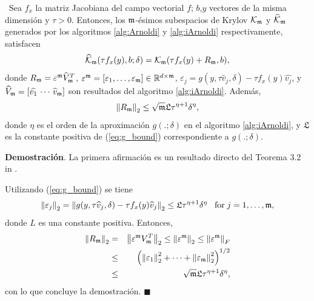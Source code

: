 \begin{theorem} \label{theorem:krilobapproxequality} \cite{naranjo2023jacobian}~Sea $f_x$ la matriz Jacobiana del campo vectorial $f$; $b$,$y$ vectores de la misma dimensión y $\tau>0$. Entonces, los $\mathfrak{m}$-ésimos subespacios de Krylov $\mathcal{K}_{\mathfrak{m}}$ y $\widehat{\mathcal{K}}_{\mathfrak{m}}$ generados por los algoritmos \ref{alg:Arnoldi} y \ref{alg:iArnoldi} respectivamente, satisfacen 
	\[ \widehat{\mathcal{K}}_{\mathfrak{m}}(\tau f_x(y),b;\delta) = \mathcal{K}_{\mathfrak{m}}(\tau f_x(y)+R_{\mathfrak{m}},b), \]
	donde $R_{\mathfrak{m}} =  \varepsilon^{\mathfrak{m}}\widehat{V}^T_{\mathfrak{m}}$,  
	$\varepsilon^{\mathfrak{m}} = [\varepsilon_1,\dots,\varepsilon_{\mathfrak{m}}] \in \mathbb{R}^{d\times \mathfrak{m}}$, $\varepsilon_j = g(y,\tau\widehat{v}_j,\delta)- \tau f_x(y)\widehat{v_j}$, y $\widehat{V}_{\mathfrak{m}}=[\widehat{v_1}\,\cdots \,\widehat{v}_{\mathfrak{m}}]$ son resultados del algoritmo \ref{alg:iArnoldi}. Además, 
	\[ \left\lVert R_{\mathfrak{m}} \right\rVert_2\leq \sqrt{\mathfrak{m}}\mathfrak{L} \tau^{\eta+1}\delta^{\eta}, \]
	donde $\eta$ es el orden de la aproximación $g(.;\delta)$ en el algoritmo \ref{alg:iArnoldi}, y $\mathfrak{L}$ es la constante positiva de (\ref{eq:g_bound}) correspondiente a $g(.;\delta)$.
\end{theorem}
\textbf{Demostración}. La primera afirmación es un resultado directo del Teorema 3.2 in \cite{brown1987local}.

Utilizando  (\ref{eq:g_bound}) se tiene
\[ \left\lVert \varepsilon_j \right\rVert_2=\left\lVert g(y,\tau\widehat{v}_j,\delta)-\tau f_x(y)\widehat{v}_j \right\rVert_2 \leq  \mathfrak{L} \tau^{\eta+1}\delta^{\eta}\;\;\;\text{for}\;j=1,\dots,\mathfrak{m}, \]
donde $L$ es una constante positiva. Entonces, 
\begin{eqnarray*}
	\left\lVert R_{\mathfrak{m}} \right\rVert_2 & = & \left\lVert \varepsilon^{\mathfrak{m}} V_{\mathfrak{m}}^T \right\rVert_2\leq\left\lVert \varepsilon^{\mathfrak{m}} \right\rVert_2\leq \left\lVert \varepsilon^{\mathfrak{m}} \right\rVert_F \\
	& \leq & \left( \left\lVert \varepsilon_1 \right\rVert_2^2 + \cdots + \left\lVert \varepsilon_{\mathfrak{m}} \right\rVert_2^2 \right)^{1/2} \\
	& \leq & \sqrt{\mathfrak{m}}\mathfrak{L} \tau^{\eta+1}\delta^{\eta},
\end{eqnarray*}
con lo que concluye la demostración. $\blacksquare$\\

